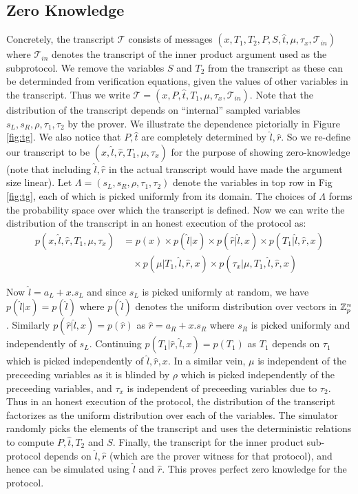 \documentclass[11pt]{article}
\newcommand{\mc}{\mathcal}
\begin{document}
\subsection{Zero Knowledge}
Concretely, the transcript $\mc{T}$ consists of messages
$(x,T_1,T_2,P,S,\hat{t},\mu,\tau_x,\mc{T}_{in})$ where $\mc{T}_{in}$ denotes the
transcript of the inner product argument used as the subprotocol. We remove the
variables $S$ and $T_2$ from the transcript as these can be determinded from
verification equations, given the values of other variables in the transcript.
Thus we write $\mc{T}=(x,P,\hat{t},T_1,\mu,\tau_x,\mc{T}_{in})$. Note that the
distribution of the transcript depends on ``internal'' sampled variables
$s_L,s_R,\rho,\tau_1,\tau_2$ by the prover. We illustrate the dependence
pictorially in Figure \ref{fig:tg}. We also notice that $P,\hat{t}$ are
completely determined by $\hat{l},\hat{r}$. So we re-define our transcript to
be $(x,\hat{l},\hat{r},T_1,\mu,\tau_x)$ for the purpose of showing
zero-knowledge (note that including $\hat{l},\hat{r}$ in the actual transcript
would have made the argument size linear). Let $\Lambda =
(s_L,s_R,\rho,\tau_1,\tau_2)$ denote the variables in top row in Fig
\ref{fig:tg}, each of which is picked uniformly from its domain. The choices of
$\Lambda$ forms the probability space over which the transcript is defined.
Now we can
write the distribution of the transcript in an honest execution of the protocol
as:
\begin{align}\label{eq:factor}
p(x,\hat{l},\hat{r},T_1,\mu,\tau_x) &= p(x)\times p(\hat{l}|x)\times p(\hat{r}|\hat{l},x)\times p(T_1|\hat{l},\hat{r},x) \nonumber \\ 
&\quad \times p(\mu|T_1,\hat{l},\hat{r},x)\times
  p(\tau_x|\mu,T_1,\hat{l},\hat{r},x)
\end{align}

Now $\hat{l} = a_L + x.s_L$ and since $s_L$ is picked
uniformly at random, we have
$p(\hat{l}|x)=p(\hat{l})$ where $p(\hat{l})$ denotes the uniform distribution
over vectors in $\mathbb{Z}_p^n$. Similarly $p(\hat{r}|\hat{l},x)=p(\hat{r})$ as
$\hat{r}=a_R + x.s_R$ where $s_R$ is picked uniformly and independently of
$s_L$. Continuing $p(T_1|\hat{r},\hat{l},x)=p(T_1)$ as $T_1$ depends on
$\tau_1$ which is picked independently of $\hat{l},\hat{r},x$. In a similar
vein, $\mu$ is independent of the preceeding variables as it is blinded by
$\rho$ which is picked independently of the preceeding variables, and $\tau_x$
is independent of preceeding variables due to $\tau_2$. Thus in an honest
execution of the protocol, the distribution of the transcript factorizes as the
uniform distribution over each of the variables. The simulator randomly picks
the elements of the transcript and uses the deterministic relations to compute
$P,\hat{t},T_2$ and $S$. Finally, the transcript for
the inner product sub-protocol depends on $\hat{l},\hat{r}$ (which are the
prover witness for that protocol), and hence can be simulated using $\hat{l}$
and $\hat{r}$. This proves perfect zero knowledge for the protocol.
\end{document}
